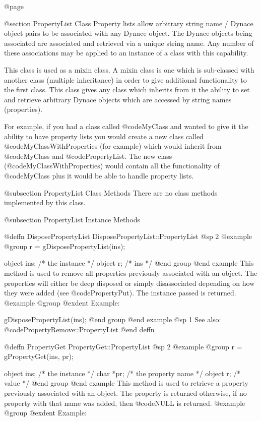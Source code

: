 @page

@section PropertyList Class
Property lists allow arbitrary string name / Dynace object pairs to
be associated with any Dynace object.  The Dynace objects being associated
are associated and retrieved via a unique string name.  Any number of these
associations may be applied to an instance of a class with this capability.

This class is used as a mixin class.  A mixin class is one which is
sub-classed with another class (multiple inheritance) in order to give
additional functionality to the first class.  This class gives any class
which inherits from it the ability to set and retrieve arbitrary Dynace
objects which are accessed by string names (properties).

For example, if you had a class called @code{MyClass} and wanted to give it
the ability to have property lists you would create a new class called
@code{MyClassWithProperties} (for example) which would inherit from
@code{MyClass} and @code{PropertyList}.  The new class (@code{MyClassWithProperties})
would contain all the functionality of @code{MyClass} plus it would be able
to handle property lists.


@subsection PropertyList Class Methods
There are no class methods implemented by this class.


@subsection PropertyList Instance Methods










@deffn {DisposePropertyList} DisposePropertyList::PropertyList
@sp 2
@example
@group
r = gDisposePropertyList(ins);

object  ins;   /*  the instance */
object  r;     /*  ins  */
@end group
@end example
This method is used to remove all properties previously associated with an
object.  The properties will either be deep disposed or simply disassociated
depending on how they were added (see @code{PropertyPut}).  The instance
passed is returned.
@example
@group
@exdent Example:

gDisposePropertyList(ins); 
@end group
@end example
@sp 1
See also:  @code{PropertyRemove::PropertyList}
@end deffn





@deffn {PropertyGet} PropertyGet::PropertyList
@sp 2
@example
@group
r = gPropertyGet(ins, pr);

object  ins;   /*  the instance */
char   *pr;    /*  the property name  */
object  r;     /*  value  */
@end group
@end example
This method is used to retrieve a property previously associated with an
object.  The property is returned otherwise, if no property with that name
was added, then @code{NULL} is returned.
@example
@group
@exdent Example:

